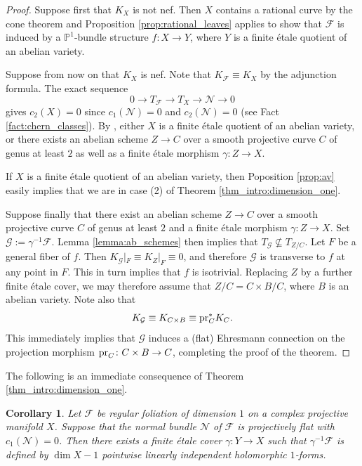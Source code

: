 \documentclass[english,10pt]{amsart}
\newcommand{\cF}{\mathcal{F}}
\newcommand{\cG}{\mathcal{G}}
\newcommand{\sN}{\mathscr{N}}
\newtheorem{cor}[thm]{Corollary}
\theoremstyle{definition}
\theoremstyle{remark}
\numberwithin{equation}{section}
\begin{document}
\begin{proof}
Suppose first that $K_X$ is not nef. Then $X$ contains a rational curve by the cone theorem and Proposition \ref{prop:rational_leaves} applies to show that $\cF$ is induced by a $\mathbb{P}^1$-bundle structure $f \colon X \to Y$, where $Y$ is a finite \'etale quotient of an abelian variety. 

Suppose from now on that $K_X$ is nef. Note that $K_\cF \equiv K_X$ by the adjunction formula.
The exact sequence
\[
0 \to T_\cF \to T_X \to \sN \to 0 
\]
gives $c_2(X) = 0$ since $c_1(\sN)=0$ and $c_2(\sN)=0$ (see Fact \ref{fact:chern_classes}). By \cite[Theorem 1.2]{iwai_matsumura_muller_2025}, either $X$ is a finite \'etale quotient of an abelian variety, or there exists an abelian scheme $Z \to C$ over a smooth projective curve $C$ of genus at least $2$ as well as a finite \'etale morphism $\gamma\colon Z \to X$.

If $X$ is a finite \'etale quotient of an abelian variety, then Poposition \ref{prop:av} easily implies that we are in case (2) of Theorem \ref{thm_intro:dimension_one}.

Suppose finally that there exist an abelian scheme $Z \to C$ over a smooth projective curve $C$ of genus at least $2$ and a finite \'etale morphism $\gamma\colon Z \to X$. Set $\cG:=\gamma^{-1}\cF$. Lemma \ref{lemma:ab_schemes} then implies that $T_\cG \not\subseteq T_{Z/C}$. Let $F$ be a general fiber of $f$. Then $K_\cG|_F \equiv K_Z|_F \equiv 0$, and therefore $\cG$ is transverse to $f$ at any point in $F$. This in turn implies that $f$ is isotrivial. Replacing $Z$ by a further finite \'etale cover, we may therefore assume that $Z/C=C \times B/C$, where $B$ is an abelian variety. Note also that
\[
K_\cG \equiv K_{C \times B} \equiv \textup{pr}_C^* K_C.
\]
This immediately implies that $\cG$ induces a (flat) Ehresmann connection on the projection morphism $\textup{pr}_C \colon C \times B \to C$, completing the proof of the theorem.
\end{proof}

The following is an immediate consequence of Theorem \ref{thm_intro:dimension_one}. 

\begin{cor}
Let $\cF$ be regular foliation of dimension $1$ on a complex projective manifold $X$. Suppose that the normal bundle $\sN$ of $\cF$ is projectively flat with $c_1(\sN)=0$. Then there exists a finite \'etale cover $\gamma \colon Y \to X$ such that $\gamma^{-1}\cF$ is defined by $\dim X - 1$ pointwise linearly independent holomorphic $1$-forms.
\end{cor}
\end{document}
